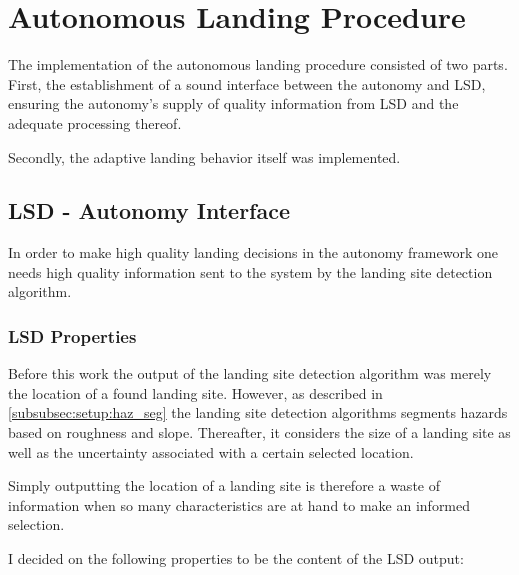 \chapter{Autonomous Landing Procedure}\label{chapter:autonomous_landing_procedure}

The implementation of the autonomous landing procedure consisted of two parts. First, the establishment of a sound interface between the autonomy and LSD, ensuring the autonomy's supply of quality information from LSD and the adequate processing thereof. 

Secondly, the adaptive landing behavior itself was implemented.

\section{LSD - Autonomy Interface}\label{subsubsec:lsd_autonomy_interface}

In order to make high quality landing decisions in the autonomy framework one needs high quality information sent to the system by the landing site detection algorithm.

\subsection{LSD Properties}\label{sec:LSproperties}

Before this work the output of the landing site detection algorithm was merely the location of a found landing site. However, as described in \cref{subsubsec:setup:haz_seg} the landing site detection algorithms segments hazards based on roughness and slope. Thereafter, it considers the size of a landing site as well as the uncertainty associated with a certain selected location. 

Simply outputting the location of a landing site is therefore a waste of information when so many characteristics are at hand to make an informed selection. 

I decided on the following properties to be the content of the LSD output:

